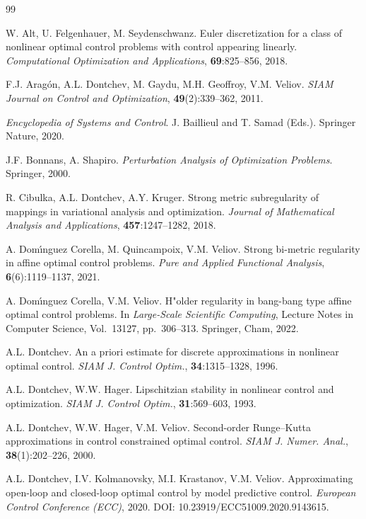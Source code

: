 \documentclass[11pt]{article}
\begin{document}
\begin{thebibliography}{99}

W. Alt, U. Felgenhauer, M. Seydenschwanz.
Euler discretization for a class of nonlinear optimal control problems with control appearing linearly.
{\em Computational Optimization and Applications}, {\bf 69}:825--856, 2018.

F.J. Arag\'on, A.L. Dontchev, M. Gaydu, M.H. Geoffroy, V.M. Veliov.
{\em SIAM Journal on Control and Optimization}, {\bf 49}(2):339--362, 2011.

{\em Encyclopedia of Systems and Control}. J. Baillieul and T. Samad (Eds.). Springer Nature, 2020.

J.F. Bonnans, A. Shapiro.
{\em Perturbation Analysis of Optimization Problems}. Springer, 2000.

R. Cibulka, A.L. Dontchev, A.Y. Kruger. 
Strong metric subregularity of mappings in variational analysis and optimization.
{\em Journal of Mathematical Analysis and Applications}, {\bf 457}:1247--1282, 2018.

A. Dom\'{\i}nguez Corella, M. Quincampoix, V.M. Veliov.
Strong bi-metric regularity in affine optimal control problems.
{\em Pure and Applied Functional Analysis}, {\bf 6}(6):1119--1137, 2021.

A. Dom\'{\i}nguez Corella, V.M. Veliov.
H"older regularity in bang-bang type affine optimal control problems.
In {\em Large-Scale Scientific Computing}, Lecture Notes in Computer Science, Vol.~13127, pp.~306--313.
Springer, Cham, 2022.

A.L. Dontchev. An a priori estimate for discrete approximations in nonlinear optimal control.
{\em SIAM J. Control Optim.}, {\bf 34}:1315--1328, 1996.

A.L. Dontchev, W.W. Hager. 
Lipschitzian stability in nonlinear control and optimization. 
{\em SIAM J. Control Optim.}, {\bf 31}:569--603, 1993.

A.L. Dontchev, W.W. Hager, V.M. Veliov.
Second-order Runge--Kutta approximations in control constrained optimal control.
{\em SIAM J. Numer. Anal.}, {\bf 38}(1):202--226, 2000.

A.L. Dontchev, I.V. Kolmanovsky, M.I. Krastanov, V.M. Veliov.
Approximating open-loop and closed-loop optimal control by model predictive control.
{\em European Control Conference (ECC)}, 2020. DOI: 10.23919/ECC51009.2020.9143615.


\end{thebibliography}
\end{document}
